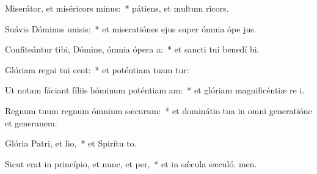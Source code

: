 \item Miserátor, et miséricors minus:~* pátiens, et multum ricors.
\item Suávis Dóminus unisis:~* et miseratiónes ejus super ómnia ópe jus.
\item Confiteántur tibi, Dómine, ómnia ópera a:~* et sancti tui benedí bi.
\item Glóriam regni tui cent:~* et poténtiam tuam tur:
\item Ut notam fáciant fíliis hóminum poténtiam am:~* et glóriam magnificéntiæ re i.
\item Regnum tuum regnum ómnium sæcurum:~* et dominátio tua in omni generatióne et generanem.
\item Glória Patri, et lio,~* et Spirítu to.
\item Sicut erat in princípio, et nunc, et per,~* et in sǽcula sæculó. men.
